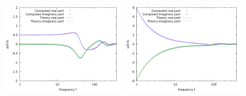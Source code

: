\documentclass{article}
\begin{document}
\begin{center}
\includegraphics[width=0.48\textwidth]{wave-guide-tet/with-attenuation/pressure-at-center.png}
\includegraphics[width=0.48\textwidth]{wave-guide-tet/with-attenuation/velocity-at-center.png}
\end{center}
\end{document}
